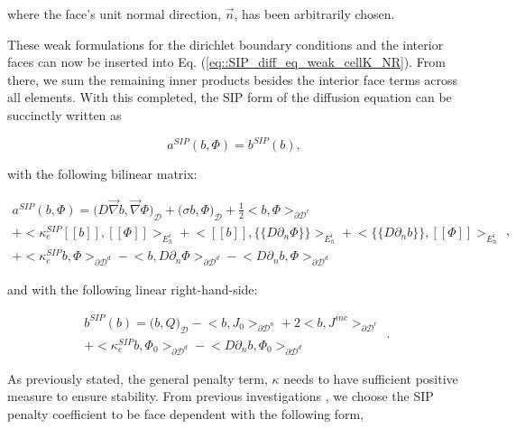 \noindent where the face's unit normal direction, $\vec{n}$, has been arbitrarily chosen.

These weak formulations for the dirichlet boundary conditions and the interior faces can now be inserted into Eq. (\ref{eq::SIP_diff_eq_weak_cellK_NR}). From there, we sum the remaining inner products besides the interior face terms across all elements. With this completed, the SIP form of the diffusion equation can be succinctly written as

\begin{equation}
a^{SIP}( b, \Phi) = b^{SIP}(b),
\label{eq::SIP_weak_form}
\end{equation}

\noindent with the following bilinear matrix:

\begin{equation}
\label{eq::SIP_bilinear_form}
\begin{aligned}
a^{SIP}( b, \Phi)  = \Big(  D \vec{\nabla}  b , \vec{\nabla} \Phi  \Big)_{\mathcal{D}} + \Big(  \sigma   b ,  \Phi  \Big)_{\mathcal{D}}  +  \frac{1}{2} \Big<    b , \Phi \Big>_{\partial \mathcal{D}^r}   \\
+  \Big< \kappa_e^{SIP} [\![   b ]\!] , [\![  \Phi ]\!]\Big>_{E_h^i} + \Big<  [\![   b ]\!] , \{\!\{  D \partial_n \Phi \}\!\}\Big>_{E_h^i}  + \Big< \{\!\{  D \partial_n  b \}\!\} , [\![ \Phi ]\!]\Big>_{E_h^i} \\
+ \Big< \kappa_e^{SIP}   b ,   \Phi \Big>_{\partial \mathcal{D}^d} - \Big<   b  ,  D \partial_n \Phi \Big>_{\partial \mathcal{D}^d} - \Big<   D 				\partial_n  b , \Phi \Big>_{\partial \mathcal{D}^d}  
\end{aligned} ,
\end{equation}

\noindent and with the following linear right-hand-side:

\begin{equation}
\label{eq::SIP_linear_form}
\begin{aligned}
b^{SIP} (b) = \Big(  b, Q  \Big)_{\mathcal{D}}  - \Big<   b, J_{0}  \Big>_{\partial \mathcal{D}^n} +  2 \Big<  b, J^{inc}  \Big>_{\partial \mathcal{D}^r} \\ + \Big< \kappa_e^{SIP}  b, \Phi_0  \Big>_{\partial \mathcal{D}^d} - \Big<    D \partial_n b ,\Phi_0 \Big>_{\partial \mathcal{D}^d} 
\end{aligned} .
\end{equation}

\noindent As previously stated, the general penalty term, $\kappa$ needs to have sufficient positive measure to ensure stability. From previous investigations \cite{ref::DSA_wang_ragusa,wang2009adaptive,turcksin2014discontinuous}, we choose the SIP penalty coefficient to be face dependent with the following form,

